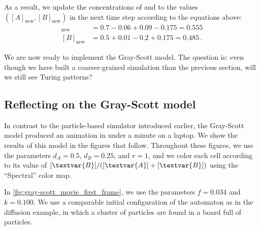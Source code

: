 As a result, we update the concentrations of  and  to the values $([A]_{\text{new}}, [B]_{\text{new}})$ in the next time step according to the equations above:
\begin{align*}
[A]_{\text{new}} & = 0.7 - 0.06 + 0.09 - 0.175 = 0.555\\
[B]_{\text{new}} & = 0.5 + 0.01 - 0.2 + 0.175 = 0.485\,.
\end{align*}

We are now ready to implement the Gray-Scott model. The question is: even though we have built a coarser-grained simulation than the previous section, will we still see Turing patterns?

\FloatBarrier
{}
\subsection{Reflecting on the Gray-Scott model}

In contrast to the particle-based simulator introduced earlier, the Gray-Scott model produced an animation in under a minute on a laptop. We show the results of this model in the figures that follow. Throughout these figures, we use the parameters $d_A = 0.5$, $d_B = 0.25$, and $r = 1$, and we color each cell according to its value of $[\textvar{B}]/([\textvar{A}] + [\textvar{B}])$ using the ``Spectral'' color map.

In \autoref{fig:gray-scott_movie_first_frame}, we use the parameters  $f = 0.034$ and $k = 0.100$. We use a comparable initial configuration of the automaton as in the diffusion example, in which a cluster of  particles are found in a board full of  particles.

